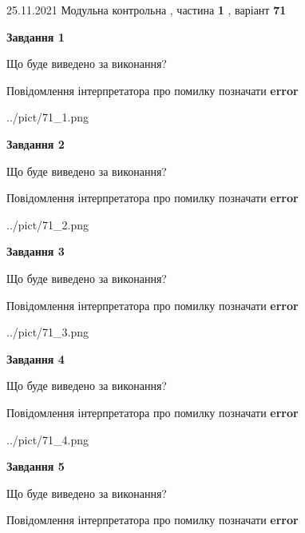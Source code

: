 \documentclass[10pt, ukrainian]{article}
\begin{document}
{25.11.2021 Модульна контрольна , частина \textbf { 1 }, варіант  \No \textbf { 71 }\par}
{
\begin {large}

{\begin {center}\textbf{Завдання 1}\end {center}}\par
Що буде виведено за виконання? \par
Повідомлення інтерпретатора про помилку позначати \textbf{error}

\begin{center}
	{../pict/71_1.png}
\end{center}
\newpage

{\begin {center}\textbf{Завдання 2}\end {center}}\par
Що буде виведено за виконання? \par
Повідомлення інтерпретатора про помилку позначати \textbf{error}

\begin{center}
	{../pict/71_2.png}
\end{center}
\newpage

{\begin {center}\textbf{Завдання 3}\end {center}}\par
Що буде виведено за виконання? \par
Повідомлення інтерпретатора про помилку позначати \textbf{error}

\begin{center}
	{../pict/71_3.png}
\end{center}
\newpage

{\begin {center}\textbf{Завдання 4}\end {center}}\par
Що буде виведено за виконання? \par
Повідомлення інтерпретатора про помилку позначати \textbf{error}

\begin{center}
	{../pict/71_4.png}
\end{center}
\newpage

{\begin {center}\textbf{Завдання 5}\end {center}}\par
Що буде виведено за виконання? \par
Повідомлення інтерпретатора про помилку позначати \textbf{error}


\end{large}}
\end{document}
